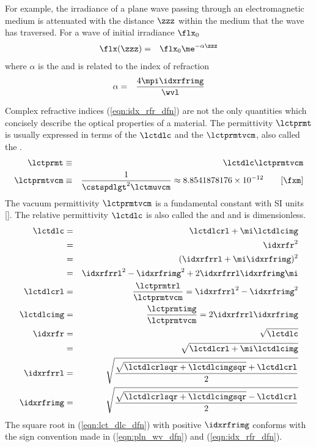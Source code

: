 \documentclass[12pt,twoside]{book}
\begin{document}
For example, the irradiance of a plane wave passing through an
electromagnetic medium is attenuated with the distance $\zzz$
within the medium that the wave has traversed.
For a wave of initial irradiance $\flx_{0}$
\begin{eqnarray}
\flx(\zzz) & = & \flx_{0} \me^{-\alpha \zzz}
\label{eqn:irr_dfn}
\end{eqnarray}
where $\alpha$ is the  and is related
to the index of refraction
\begin{eqnarray}
\alpha & = & \frac{4 \mpi \idxrfrimg}{\wvl }
\label{eqn:abs_cff_dfn_dfn}
\end{eqnarray}

Complex refractive indices (\ref{eqn:idx_rfr_dfn}) are not the only 
quantities which concisely describe the optical properties of a
material.
The permittivity $\lctprmt$ is usually expressed in terms of
the  $\lctdlc$ and
the  $\lctprmtvcm$, also called the 
.
\begin{eqnarray}
\lctprmt & \equiv & \lctdlc \lctprmtvcm \\
\lctprmtvcm & \equiv & \frac{1}{\cstspdlgt^{2}\lctmuvcm} 
\approx 8.8541878176 \times 10^{-12} \qquad [\mbox{\fxm}]
\end{eqnarray}
The vacuum permittivity $\lctprmtvcm$ is a fundamental constant with
SI units [\fxm]. 
The relative permittivity $\lctdlc$ is also called the 
 and  and is
dimensionless.  
\begin{eqnarray}
\label{eqn:lct_dlc_dfn}
\lctdlc & = & \lctdlcrl + \mi \lctdlcimg \\
& = & \idxrfr^{2} \nonumber \\
& = & (\idxrfrrl + \mi \idxrfrimg)^{2} \nonumber \\
& = & \idxrfrrl^{2} - \idxrfrimg^{2} + 2 \idxrfrrl \idxrfrimg \mi \nonumber \\
\lctdlcrl & = & \frac{\lctprmtrl}{\lctprmtvcm} =
\idxrfrrl^{2} - \idxrfrimg^{2} \nonumber \\
\lctdlcimg & = & \frac{\lctprmtimg}{\lctprmtvcm} =
2 \idxrfrrl \idxrfrimg \nonumber \\
\idxrfr & = & \sqrt{\lctdlc} \nonumber \\
& = & \sqrt{ \lctdlcrl + \mi \lctdlcimg} \nonumber \\
\idxrfrrl & = & \sqrt{ 
\frac{\sqrt{\lctdlcrlsqr + \lctdlcimgsqr} + \lctdlcrl}{2}}
\nonumber \\
\idxrfrimg & = & \sqrt{ 
\frac{\sqrt{\lctdlcrlsqr + \lctdlcimgsqr} - \lctdlcrl}{2}}
\nonumber
\end{eqnarray}
The square root in (\ref{eqn:lct_dlc_dfn}) with positive $\idxrfrimg$  
conforms with the sign convention made in (\ref{eqn:pln_wv_dfn}) and
(\ref{eqn:idx_rfr_dfn}).  
\end{document}
